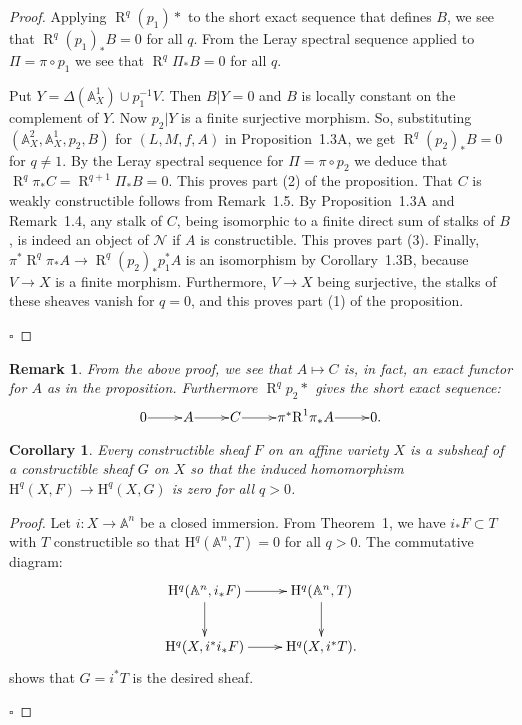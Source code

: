 \documentclass[10pt,twoside]{article}
\newtheorem{cor}[thm]{Corollary}
\newcommand{\homology}{{\mathrm {H}}}
\newcommand{\A}{{\mathbb {A}}}
\newcommand{\derived}{{\operatorname{R}}}
\newcommand{\qed}{\nopagebreak\par\hspace*{\fill}$\square$\par\vskip2mm}
\newtheorem{proof}{Proof}
\newtheorem{remark}[thm]{Remark}
\begin{document}
\begin{proof} Applying
$\derived ^q(p_1)*$ to the short exact sequence that defines
$B$, we see that $\derived ^q(p_1)_*B=0$ for all $q$. From the
Leray spectral sequence applied to $\Pi=\pi\circ p_1$ we see that
$\derived ^q\Pi_*B=0$ for all $q$.

Put $Y=\Delta (\A ^1_X) \cup p_1^{-1}V$. Then $B|Y=0$ and
$B$ is locally constant on the complement of $Y$. Now 
 $p_2|Y$ is a finite surjective morphism. So, substituting 
$(\A^2_X,\A^1_X,p_2,B)$ for $(L,M,f,A)$ in Proposition~1.3A,
we get $\derived ^q(p_2)_*B=0$
for $q \neq 1$. By the Leray spectral sequence for
$\Pi=\pi\circ p_2$ we deduce that   
$\derived ^q\pi_*C=\derived ^{q+1}\Pi _*B=0$. This proves part (2)
of the proposition. That $C$ is weakly constructible 
follows from Remark~1.5. By Proposition~1.3A and Remark~1.4,
 any stalk of $C$, being isomorphic to
 a finite direct sum of stalks of $B$,
 is indeed an object of $\mathcal{N}$ if $A$ is constructible.
This proves part (3). Finally, 
$ \pi^*\derived ^q\pi_*A \to \derived^q(p_2)_*p_1^*A$ is an
isomorphism by Corollary~1.3B, because $V \to X$ is a 
finite morphism. Furthermore, $V \to X$ being surjective, 
the stalks of these sheaves vanish for $q=0$, and this proves
part (1) of the proposition. 
\qed\end{proof} 

\renewcommand{\thethm}{2.3}

\begin{remark}
From the above proof, we see that
$A \mapsto C$ is, in fact, an exact functor for $A$ as
in the proposition. Furthermore $\derived^qp_2*$ gives the
short exact sequence:
$$\xymatrix@1{
0 \ar[r] & A \ar[r] & C \ar[r] & \pi^*\derived ^1\pi_*A \ar[r] & 0.
}
$$
\end{remark}

\renewcommand{\thethm}{2.4}

\begin{cor} Every constructible
 sheaf $F$ on an affine variety $X$
is a subsheaf of a constructible 
sheaf $G$ on $X$ so that the induced homomorphism
$\homology^q(X,F)\to \homology^q(X,G)$ is zero for all $q>0$.
\end{cor}

\begin{proof} Let $i:X \to \A^n$ be a closed immersion.
From Theorem~1, we have 
$i_*F\subset T$ with $T$ constructible so that $\homology^q(\A^n,T)
=0$ for all $q>0$. The commutative diagram:
$$
\xymatrix{  
\homology^q(\A^n,i_*F) \ar[r]\ar[d] & \homology^q(\A^n,T)\ar[d]\\  
\homology^q(X,i^*i_*F) \ar[r] & \homology^q(X,i^*T).
} 
$$
shows that $G=i^*T$ is the desired sheaf.
\qed\end{proof}
\end{document}
